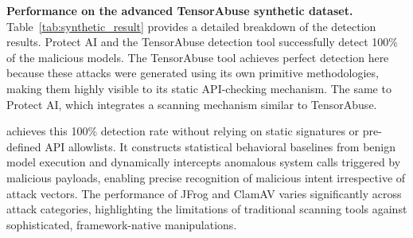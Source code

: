 %

\noindent \textbf{Performance on the advanced TensorAbuse synthetic dataset.} Table~\ref{tab:synthetic_result} provides a detailed breakdown of the detection results. Protect AI and the TensorAbuse detection tool successfully detect 100\% of the malicious models. The TensorAbuse tool achieves perfect detection here because these attacks were generated using its own primitive methodologies, making them highly visible to its static API-checking mechanism. The same to Protect AI, which integrates a scanning mechanism similar to TensorAbuse. 

\toolname{} achieves this 100\% detection rate without relying on static signatures or pre-defined API allowlists. It constructs statistical behavioral baselines from benign model execution and dynamically intercepts anomalous system calls triggered by malicious payloads, enabling precise recognition of malicious intent irrespective of attack vectors. The performance of JFrog and ClamAV varies significantly across attack categories, highlighting the limitations of traditional scanning tools against sophisticated, framework-native manipulations.


